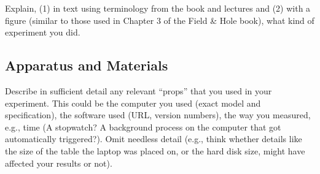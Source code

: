 \documentclass{article}
\begin{document}
Explain, (1) in text using terminology from the book and lectures and (2) with a figure (similar to those used in Chapter 3 of the Field \& Hole book), what kind of experiment you did.

\subsection{Apparatus and Materials}
Describe in sufficient detail any relevant “props” that you used in your experiment. This could be the computer you used (exact model and specification), the software used (URL, version numbers), the way you measured, e.g., time (A stopwatch? A background process on the computer that got automatically triggered?). Omit needless detail (e.g., think whether details like the size of the table the laptop was placed on, or the hard disk size, might have affected your results or not).
\end{document}
